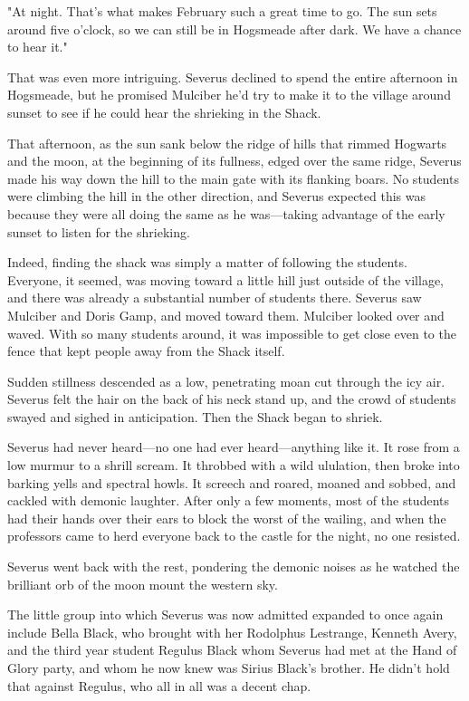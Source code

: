 "At night. That's what makes February such a great time to go. The sun sets around five o'clock, so we can still be in Hogsmeade after dark. We have a chance to hear it."

That was even more intriguing. Severus declined to spend the entire afternoon in Hogsmeade, but he promised Mulciber he'd try to make it to the village around sunset to see if he could hear the shrieking in the Shack.

That afternoon, as the sun sank below the ridge of hills that rimmed Hogwarts and the moon, at the beginning of its fullness, edged over the same ridge, Severus made his way down the hill to the main gate with its flanking boars. No students were climbing the hill in the other direction, and Severus expected this was because they were all doing the same as he was—taking advantage of the early sunset to listen for the shrieking.

Indeed, finding the shack was simply a matter of following the students. Everyone, it seemed, was moving toward a little hill just outside of the village, and there was already a substantial number of students there. Severus saw Mulciber and Doris Gamp, and moved toward them. Mulciber looked over and waved. With so many students around, it was impossible to get close even to the fence that kept people away from the Shack itself.

Sudden stillness descended as a low, penetrating moan cut through the icy air. Severus felt the hair on the back of his neck stand up, and the crowd of students swayed and sighed in anticipation. Then the Shack began to shriek.

Severus had never heard—no one had ever heard—anything like it. It rose from a low murmur to a shrill scream. It throbbed with a wild ululation, then broke into barking yells and spectral howls. It screech and roared, moaned and sobbed, and cackled with demonic laughter. After only a few moments, most of the students had their hands over their ears to block the worst of the wailing, and when the professors came to herd everyone back to the castle for the night, no one resisted.

Severus went back with the rest, pondering the demonic noises as he watched the brilliant orb of the moon mount the western sky.

The little group into which Severus was now admitted expanded to once again include Bella Black, who brought with her Rodolphus Lestrange, Kenneth Avery, and the third year student Regulus Black whom Severus had met at the Hand of Glory party, and whom he now knew was Sirius Black's brother. He didn't hold that against Regulus, who all in all was a decent chap.

